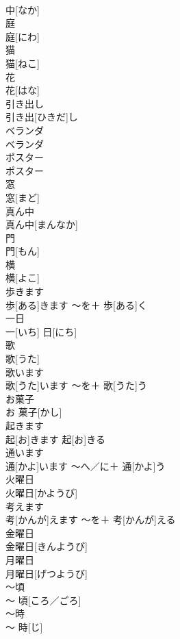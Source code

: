 \documentclass[8pt]{extreport}
\begin{document}
\begin{CJK}{UTF8}{min}
\\	中[なか]		
\\	庭	
\\	庭[にわ]		
\\	猫	
\\	猫[ねこ]		
\\	花	
\\	花[はな]		
\\	引き出し	
\\	引き出[ひきだ]し		
\\	ベランダ	
\\	ベランダ		
\\	ポスター	
\\	ポスター		
\\	窓	
\\	窓[まど]		
\\	真ん中	
\\	真ん中[まんなか]		
\\	門	
\\	門[もん]		
\\	横	
\\	横[よこ]		
\\	歩きます	
\\	歩[ある]きます	〜を＋ 歩[ある]く	
\\	一日	
\\	一[いち] 日[にち]		
\\	歌	
\\	歌[うた]		
\\	歌います	
\\	歌[うた]います	〜を＋ 歌[うた]う	
\\	お菓子	
\\	お 菓子[かし]		
\\	起きます	
\\	起[お]きます	起[お]きる	
\\	通います	
\\	通[かよ]います	〜へ／に＋ 通[かよ]う	
\\	火曜日	
\\	火曜日[かようび]		
\\	考えます	
\\	考[かんが]えます	〜を＋ 考[かんが]える	
\\	金曜日	
\\	金曜日[きんようび]		
\\	月曜日	
\\	月曜日[げつようび]		
\\	〜頃	
\\	〜 頃[ころ／ごろ]		
\\	〜時	
\\	〜 時[じ]		

\end{CJK}
\end{document}

